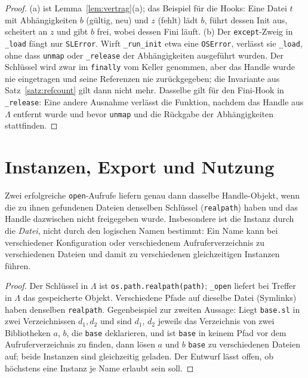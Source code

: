 \begin{proof}
	(a) ist Lemma~\ref{lem:vertrag}(a); das Beispiel für die Hooks: Eine Datei $t$ mit Abhängigkeiten $b$ (gültig, neu) und $z$ (fehlt) lädt $b$, führt dessen Init aus, scheitert an $z$ und gibt $b$ frei, wobei dessen Fini läuft. (b) Der \texttt{except}-Zweig in \texttt{\_load} fängt nur \texttt{SLError}. Wirft \texttt{\_run\_init} etwa eine \texttt{OSError}, verlässt sie \texttt{\_load}, ohne dass \texttt{unmap} oder \texttt{\_release} der Abhängigkeiten ausgeführt wurden. Der Schlüssel wird zwar im \texttt{finally} vom Keller genommen, aber das Handle wurde nie eingetragen und seine Referenzen nie zurückgegeben; die Invariante aus Satz~\ref{satz:refcount} gilt dann nicht mehr. Dasselbe gilt für den Fini-Hook in \texttt{\_release}: Eine andere Ausnahme verlässt die Funktion, nachdem das Handle aus $\Lambda$ entfernt wurde und bevor \texttt{unmap} und die Rückgabe der Abhängigkeiten stattfinden.
\end{proof}

\section{Instanzen, Export und Nutzung}

\begin{satz}[Instanzidentität]
	\label{satz:instanz}
	Zwei erfolgreiche \texttt{open}-Aufrufe liefern genau dann dasselbe Handle-Objekt, wenn die zu ihnen gefundenen Dateien denselben Schlüssel (\texttt{realpath}) haben und das Handle dazwischen nicht freigegeben wurde. Insbesondere ist die Instanz durch die \emph{Datei}, nicht durch den logischen Namen bestimmt: Ein Name kann bei verschiedener Konfiguration oder verschiedenem Aufruferverzeichnis zu verschiedenen Dateien und damit zu verschiedenen gleichzeitigen Instanzen führen.
\end{satz}

\begin{proof}
	Der Schlüssel in $\Lambda$ ist \texttt{os.path.realpath(path)}; \texttt{\_open} liefert bei Treffer in $\Lambda$ das gespeicherte Objekt. Verschiedene Pfade auf dieselbe Datei (Symlinks) haben denselben \texttt{realpath}. Gegenbeispiel zur zweiten Aussage: Liegt \texttt{base.sl} in zwei Verzeichnissen $d_1,d_2$ und sind $d_1$, $d_2$ jeweils das Verzeichnis von zwei Bibliotheken $a$, $b$, die \texttt{base} deklarieren, und ist \texttt{base} in keinem Pfad vor dem Aufruferverzeichnis zu finden, dann lösen $a$ und $b$ \texttt{base} zu verschiedenen Dateien auf; beide Instanzen sind gleichzeitig geladen. Der Entwurf lässt offen, ob höchstens eine Instanz je Name erlaubt sein soll.
\end{proof}

